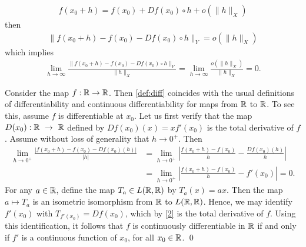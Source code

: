 \begin{framed}
\begin{remark}
    \begin{equation*}
    \begin{split}
      f(x_{0} + h) = f(x_{0}) + Df(x_{0}) \circ h + o(\| h \|_{X})
    \end{split}
    \end{equation*}
    then
    \begin{equation*}
    \begin{split}
      \| f(x_{0} + h) - f(x_{0}) - Df(x_{0}) \circ h \|_{Y} = o(\| h
      \|_{X})
    \end{split}
    \end{equation*}
    which implies
    \begin{equation*}
    \begin{split}
      \lim_{h \to \infty} \frac{\| f(x_{0} + h) - f(x_{0}) - Df(x_{0}) \circ h
      \|_{Y}}{\| h \|_{X}}  = \lim_{h \to \infty} \frac{o(\| h \|_{X})}{\| h
      \|_{X}} = 0.
    \end{split}
    \end{equation*}
  \label{rem:equiv-def}
  \end{remark}
  \end{framed}
  \begin{framed}
	\begin{remark}
		\label{rem:usual-diff}
		Consider the map $f: \mathbb{R} \to \mathbb{R}$. Then \autoref{def:diff} 
		coincides with the usual definitions of
		differentiability and continuous differentiability for maps
		from $\mathbb{R} $ to $\mathbb{R}$.
		To see this, assume $f$ is differentiable at $x_0$.
        Let us first verify that the map  $D(x_0):\mathbb{R}~\to~\mathbb{R}$ defined by
        $Df(x_0)(x)=xf'(x_0)$ is the total derivative of $f$. Assume without
        loss of generality that $h \to 0^+$. Then
		\begin{equation}
			\label{2}
			\begin{split}
				 \lim_{h \to 0^+} \frac{| f( x_0 + h) - f(x_0) -
				Df(x_0)(h) |}{|h|}
				 & = \lim_{h\to 0^+} \left |\frac{f(x_0+h) -
				f(x_0)}{h} - \frac{Df(x_0)(h)}{h}  \right |
				\\
				 & =\lim_{h \to 0^+} \left |\frac{f(x_0+h) - f(x_0)}{h} -
				f'(x_0) \right | = 0.
			\end{split}
		\end{equation}
%
%
For any $a \in \mathbb{R}$, define the map $T_{a} \in L(\mathbb{R} , \mathbb{R})$ by
$T_{a}(x) = ax$. Then the map $a \mapsto T_a$ is an isometric
isomorphism from $\mathbb{R}$ to $L( \mathbb{R}, \mathbb{R})$. Hence, 
we may identify $f'(x_0)$ with $T_{f'(x_0)} = Df(x_0)$,
which by \eqref{2} is the total derivative of $f$.  Using this identification,
it follows that $f$ is continuously
differentiable in $\mathbb{R}$ if and only if $f'$ is a continuous function of
$x_0$, for all $x_0 \in \mathbb{R}$. \qed
%
\end{remark}
\end{framed}
